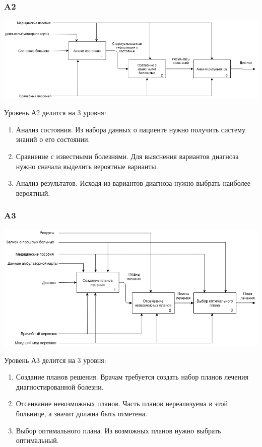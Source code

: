 \documentclass[a4paper, 12pt]{article}
\begin{document}
\subsubsection{A2}
\begin{center}
  \centering
  \includegraphics[width=.7\linewidth]{extra/as-is_A2.png}
  \label{fig:prplot}
\end{center}
Уровень А2 делится на 3 уровня:
\begin{enumerate}
  \item Анализ состояния. Из набора данных о пациенте нужно получить систему знаний о его состоянии.
  \item Сравнение с известными болезнями. Для выяснения вариантов диагноза нужно сначала выделить вероятные варианты.
  \item Анализ результатов. Исходя из вариантов диагноза нужно выбрать наиболее вероятный.
\end{enumerate}
\subsubsection{A3}
\begin{center}
  \centering
  \includegraphics[width=.7\linewidth]{extra/as-is_A3.png}
  \label{fig:prplot}
\end{center}
Уровень А3 делится на 3 уровня:
\begin{enumerate}
  \item Создание планов решения. Врачам требуется создать набор планов лечения диагностированной болезни.
  \item Отсеивание невозможных планов. Часть планов нереализуема в этой больнице, а значит должна быть отметена.
  \item Выбор оптимального плана. Из возможных планов нужно выбрать оптимальный.
\end{enumerate}
\end{document}
